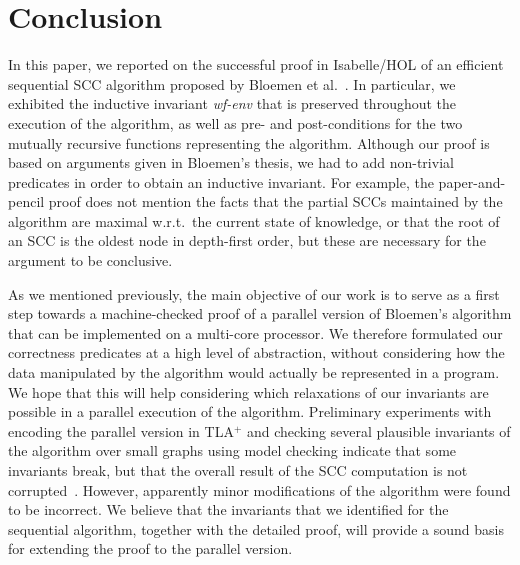 \documentclass[sigplan,10pt,anonymous,review]{acmart}
\newcommand{\prog}[1]{\textit{#1}}
\begin{document}
\section{Conclusion}
\label{sec:conclusion}

In this paper, we reported on the successful proof in Isabelle/HOL of an efficient sequential SCC algorithm proposed by Bloemen et al.~\cite{bloemen:strong,bloemen:multi-core}. In particular, we exhibited the inductive invariant \prog{wf-env} that is preserved throughout the execution of the algorithm, as well as pre- and post-conditions for the two mutually recursive functions representing the algorithm. Although our proof is based on arguments given in Bloemen's thesis, we had to add non-trivial predicates in order to obtain an inductive invariant. For example, the paper-and-pencil proof does not mention the facts that the partial SCCs maintained by the algorithm are maximal w.r.t.\ the current state of knowledge, or that the root of an SCC is the oldest node in depth-first order, but these are necessary for the argument to be conclusive.

As we mentioned previously, the main objective of our work is to serve as a first step towards a machine-checked proof of a parallel version of Bloemen's algorithm that can be implemented on a multi-core processor. We therefore formulated our correctness predicates at a high level of abstraction, without considering how the data manipulated by the algorithm would actually be represented in a program. We hope that this will help considering which relaxations of our invariants are possible in a parallel execution of the algorithm. Preliminary experiments with encoding the parallel version in TLA$^+$ and checking several plausible invariants of the algorithm over small graphs using model checking indicate that some invariants break, but that the overall result of the SCC computation is not corrupted~\cite{vandepol:exploring}. However, apparently minor modifications of the algorithm were found to be incorrect. We believe that the invariants that we identified for the sequential algorithm, together with the detailed proof, will provide a sound basis for extending the proof to the parallel version.




\end{document}

